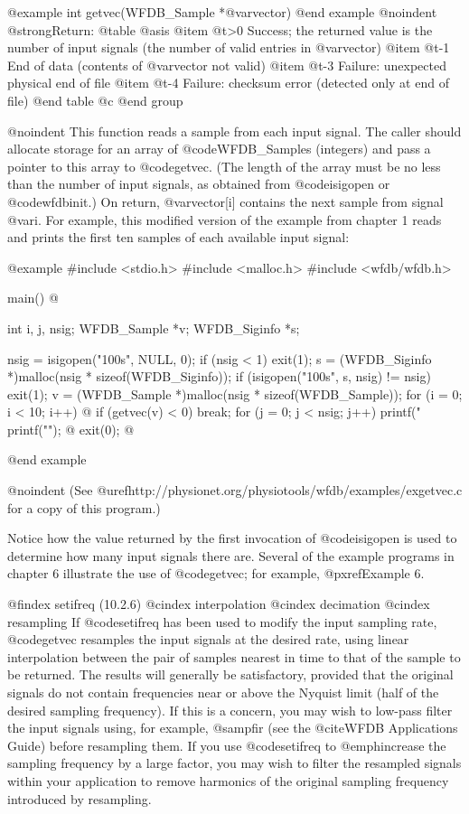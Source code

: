{{{{{{{{@example
int getvec(WFDB_Sample *@var{vector})
@end example
@noindent
@strong{Return:}
@table @asis
@item @t{>0}
Success;  the returned value is the number of input signals (the number of
valid entries in @var{vector})
@item @t{-1}
End of data (contents of @var{vector} not valid)
@item @t{-3}
Failure: unexpected physical end of file
@item @t{-4}
Failure: checksum error (detected only at end of file)
@end table
@c @end group

@noindent
This function reads a sample from each input signal.  The caller should
allocate storage for an array of @code{WFDB_Sample}s (integers) and pass a
pointer to this array to @code{getvec}.  (The length of the array must
be no less than the number of input signals, as obtained from
@code{isigopen} or @code{wfdbinit}.)  On return, @var{vector[i]}
contains the next sample from signal @var{i}.  For example, this
modified version of the example from chapter 1 reads and prints the
first ten samples of each available input signal:

@example
#include <stdio.h>
#include <malloc.h>
#include <wfdb/wfdb.h>

main()
@{
    int i, j, nsig;
    WFDB_Sample *v;
    WFDB_Siginfo *s;

    nsig = isigopen("100s", NULL, 0);
    if (nsig < 1)
        exit(1);
    s = (WFDB_Siginfo *)malloc(nsig * sizeof(WFDB_Siginfo));
    if (isigopen("100s", s, nsig) != nsig)
        exit(1);
    v = (WFDB_Sample *)malloc(nsig * sizeof(WFDB_Sample));
    for (i = 0; i < 10; i++) @{
        if (getvec(v) < 0)
            break;
        for (j = 0; j < nsig; j++)
            printf("%
        printf("\n");
    @}
    exit(0);
@}
@end example

@noindent
(See @uref{http://physionet.org/physiotools/wfdb/examples/exgetvec.c}
for a copy of this program.)

Notice how the value returned by the first invocation of @code{isigopen}
is used to determine how many input signals there are.  Several of the
example programs in chapter 6 illustrate the use of @code{getvec}; for
example, @pxref{Example 6}.

@findex setifreq (10.2.6)
@cindex interpolation
@cindex decimation
@cindex resampling
If @code{setifreq} has been used to modify the input sampling rate,
@code{getvec} resamples the input signals at the desired rate, using
linear interpolation between the pair of samples nearest in time to that
of the sample to be returned.  The results will generally be
satisfactory, provided that the original signals do not contain
frequencies near or above the Nyquist limit (half of the desired
sampling frequency).  If this is a concern, you may wish to low-pass
filter the input signals using, for example, @samp{fir} (see the
@cite{WFDB Applications Guide}) before resampling them.  If you use
@code{setifreq} to @emph{increase} the sampling frequency by a large
factor, you may wish to filter the resampled signals within your
application to remove harmonics of the original sampling frequency
introduced by resampling.

}}}}}}}}

